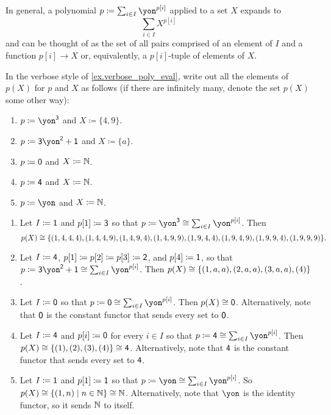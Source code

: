 \documentclass[Book-Poly]{subfiles}
\begin{document}
In general, a polynomial $p\coloneqq\sum_{i\in I}\yon^{p[i]}$ applied to a set $X$ expands to
\[
\sum_{i\in I}X^{p[i]}
\]
and can be thought of as the set of all pairs comprised of an element of $I$ and a function $p[i]\to X$ or, equivalently, a $p[i]$-tuple of elements of $X$.


\begin{exercise}
    In the verbose style of \cref{ex.verbose_poly_eval}, write out all the elements of $p(X)$ for $p$ and $X$ as follows (if there are infinitely many, denote the set $p(X)$ some other way):
    \begin{enumerate}
        \item $p\coloneqq\yon^\3$ and $X\coloneqq\{4,9\}.$
        \item $p\coloneqq\3\yon^\2+\1$ and $X\coloneqq\{a\}$.
        \item $p\coloneqq\textsf{0}$ and $X\coloneqq\mathbb{N}$.
        \item $p\coloneqq\textsf{4}$ and $X\coloneqq\mathbb{N}$.
        \item $p\coloneqq\yon$ and $X\coloneqq\mathbb{N}$.
        \qedhere
    \end{enumerate}
    \begin{solution}
        \begin{enumerate}
            \item Let $I\coloneqq\textsf{1}$ and $p[1]\coloneqq\textsf{3}$ so that $p\coloneqq\yon^\3\iso\sum_{i\in I}\yon^{p[i]}$.
            Then
            \[
            p(X)\cong\{(1, 4, 4, 4), (1, 4, 4, 9), (1, 4, 9, 4), (1, 4, 9, 9), (1, 9, 4, 4), (1, 9, 4, 9), (1, 9, 9, 4), (1, 9, 9, 9)\}.
            \]

            \item Let $I\coloneqq\textsf{4}$, $p[1]\coloneqq p[2]\coloneqq p[3]\coloneqq\textsf{2}$, and $p[4]\coloneqq\textsf{1}$, so that $p\coloneqq\3\yon^\2+\1\iso\sum_{i\in I}\yon^{p[i]}$.
            Then $p(X)\cong\{(1,a,a),(2,a,a),(3,a,a),(4)\}$.

            \item Let $I\coloneqq\textsf{0}$ so that $p\coloneqq\0\iso\sum_{i\in I}\yon^{p[i]}$.
            Then $p(X)\cong\textsf{0}$.
            Alternatively, note that $\textsf{0}$ is the constant functor that sends every set to $\textsf{0}$.

            \item Let $I\coloneqq\textsf{4}$ and $p[i]\coloneqq\textsf{0}$ for every $i\in I$ so that $p\coloneqq\4\iso\sum_{i\in I}\yon^{p[i]}$.
            Then $p(X)\cong\{(1), (2), (3), (4)\}\cong\textsf{4}$.
            Alternatively, note that $\textsf{4}$ is the constant functor that sends every set to $\textsf{4}$.

            \item Let $I \coloneqq \textsf{1}$ and $p[1] \coloneqq \textsf{1}$ so that $p\coloneqq\yon\iso\sum_{i\in I}\yon^{p[i]}$.
            So $p(X)\cong\{(1,n)\mid n\in\mathbb{N}\}\cong\mathbb{N}$.
            Alternatively, note that $\yon$ is the identity functor, so it sends $\mathbb{N}$ to itself.
        \end{enumerate}
    \end{solution}
\end{exercise}
\end{document}
